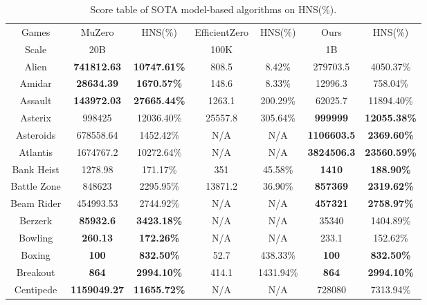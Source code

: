 \begin{table}[!hb]
\footnotesize
\begin{center}
\caption{Score table of  SOTA  model-based algorithms on HNS(\%).}
\label{Tab:Score table of SOTA  model-based algorithms on HNS.}
\setlength{\tabcolsep}{1.0pt}
\begin{tabular}{c cc cc cc }
\toprule
 Games & MuZero & HNS(\%) & EfficientZero & HNS(\%) & Ours & HNS(\%) \\ 
        Scale & 20B & ~ & 100K & ~ & 1B & ~ \\ 
        \midrule
        
        Alien & \textbf{741812.63} & \textbf{10747.61\%} & 808.5 & 8.42\% & 279703.5 & 4050.37\% \\  
        Amidar & \textbf{28634.39} & \textbf{1670.57\%} & 148.6 & 8.33\% & 12996.3 & 758.04\% \\  
        Assault & \textbf{143972.03} & \textbf{27665.44\%} & 1263.1 & 200.29\% & 62025.7 & 11894.40\% \\  
        Asterix & 998425 & 12036.40\% & 25557.8 & 305.64\% & \textbf{999999} & \textbf{12055.38\%} \\  
        Asteroids & 678558.64 & 1452.42\% & N/A & N/A & \textbf{1106603.5} & \textbf{2369.60\%} \\  
        Atlantis & 1674767.2 & 10272.64\% & N/A & N/A & \textbf{3824506.3} & \textbf{23560.59\%} \\  
        Bank Heist & 1278.98 & 171.17\% & 351 & 45.58\% & \textbf{1410} & \textbf{188.90\%} \\  
        Battle Zone & 848623 & 2295.95\% & 13871.2 & 36.90\% & \textbf{857369} & \textbf{2319.62\%} \\  
        Beam Rider & 454993.53 & 2744.92\% & N/A & N/A & \textbf{457321} & \textbf{2758.97\%} \\  
        Berzerk & \textbf{85932.6} & \textbf{3423.18\%} & N/A & N/A & 35340 & 1404.89\% \\  
        Bowling & \textbf{260.13} & \textbf{172.26\%} & N/A & N/A & 233.1 & 152.62\% \\  
        Boxing & \textbf{100} & \textbf{832.50\%} & 52.7 & 438.33\% & \textbf{100} & \textbf{832.50\%} \\  
        Breakout & \textbf{864} & \textbf{2994.10\%} & 414.1 & 1431.94\% & \textbf{864} & \textbf{2994.10\%} \\  
        Centipede & \textbf{1159049.27} & \textbf{11655.72\%} & N/A & N/A & 728080 & 7313.94\% \\  

\end{tabular}
\end{center}
\end{table}
